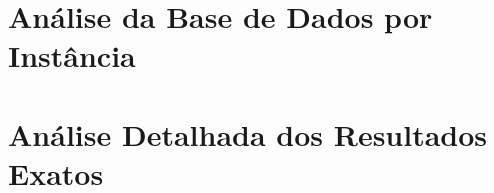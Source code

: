 \documentclass[mestrado, pre-defesa]{packages/icmc}
\begin{document}
% 


\begin{apendicesenv}

    \chapter{Análise da Base de Dados por Instância}
    \label{apendice-cap:analise-base-dados}
    

    \chapter{Análise Detalhada dos Resultados Exatos}
    \label{apendice-cap:exato-detalhe}
    

\end{apendicesenv}



\begin{anexosenv}


\end{anexosenv}
\end{document}
